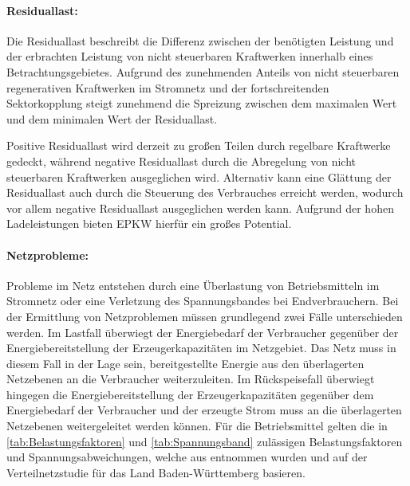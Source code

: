 \paragraph{Residuallast:}

Die Residuallast beschreibt die Differenz zwischen der benötigten Leistung und der erbrachten Leistung von nicht steuerbaren Kraftwerken innerhalb eines Betrachtungsgebietes.
Aufgrund des zunehmenden Anteils von nicht steuerbaren regenerativen Kraftwerken im Stromnetz und der fortschreitenden Sektorkopplung steigt zunehmend die Spreizung zwischen dem maximalen Wert und dem minimalen Wert der Residuallast.\medskip


Positive Residuallast wird derzeit zu großen Teilen durch regelbare Kraftwerke gedeckt, während negative Residuallast durch die Abregelung von nicht steuerbaren Kraftwerken ausgeglichen wird.
Alternativ kann eine Glättung der Residuallast auch durch die Steuerung des Verbrauches erreicht werden, wodurch vor allem negative Residuallast ausgeglichen werden kann.
Aufgrund der hohen Ladeleistungen bieten \gls{EPKW} hierfür ein großes Potential. \cite{Paschotta2020a}


\paragraph{Netzprobleme:}

Probleme im Netz entstehen durch eine Überlastung von Betriebsmitteln im Stromnetz oder eine Verletzung des Spannungsbandes bei Endverbrauchern.
Bei der Ermittlung von Netzproblemen müssen grundlegend zwei Fälle unterschieden werden.
Im Lastfall überwiegt der Energiebedarf der Verbraucher gegenüber der Energiebereitstellung der Erzeugerkapazitäten im Netzgebiet.
Das Netz muss in diesem Fall in der Lage sein, bereitgestellte Energie aus den überlagerten Netzebenen an die Verbraucher weiterzuleiten.
Im Rückspeisefall überwiegt hingegen die Energiebereitstellung der Erzeugerkapazitäten gegenüber dem Energiebedarf der Verbraucher und der erzeugte Strom muss an die überlagerten Netzebenen weitergeleitet werden können. \cite{Agora2019}
Für die Betriebsmittel gelten die in \autoref{tab:Belastungsfaktoren} und \autoref{tab:Spannungsband} zulässigen Belastungsfaktoren und Spannungsabweichungen, welche aus \cite{Mueller2019a} entnommen wurden und auf der Verteilnetzstudie für das Land Baden-Württemberg \cite{Rehtanz2017} basieren.



